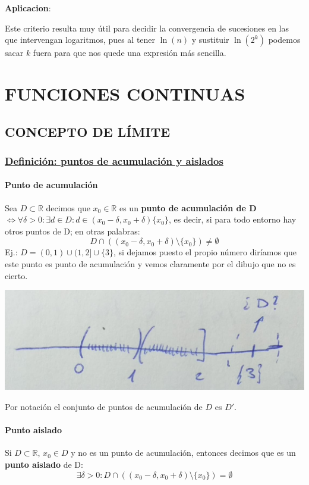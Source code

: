 \documentclass[10pt,a4paper,openright]{book}
\begin{document}
\textbf{Aplicacion}:

Este criterio resulta muy útil para decidir la convergencia de sucesiones en las que intervengan logaritmos, pues al tener $\ln (n)$ y sustituir $\ln (2^k)$ podemos sacar $k$ fuera para que nos quede una expresión más sencilla.


\chapter*{FUNCIONES CONTINUAS}
\section*{CONCEPTO DE LÍMITE}
\subsection*{\underline{Definición: puntos de acumulación y aislados}}
\subsubsection*{Punto de acumulación}
Sea $D\subset \mathbb R$ decimos que $x_0\in \mathbb R$ es un \textbf{punto de acumulación de D} $\Leftrightarrow \forall \delta>0: \exists d\in D: d\in (x_0-\delta, x_0+\delta)\{x_0\}$, es decir, si para todo entorno hay otros puntos de D; en otras palabras:
$$D\cap \left((x_0-\delta, x_0+\delta)\mbox{\textbackslash} \{x_0\}\right)\neq \emptyset$$
Ej.: $D=(0,1)\cup (1,2]\cup \{3\}$, si dejamos puesto el propio número diríamos que este punto es punto de acumulación y vemos claramente por el dibujo que no es cierto.\par

\begin{center}
\includegraphics[scale=0.20]{Cauchy 2}
\end{center}

Por notación el conjunto de puntos de acumulación de $D$ es $D'$.

\subsubsection*{Punto aislado}
Si $D\subset \mathbb R$, $x_0\in D$ y no es un punto de acumulación, entonces decimos que es un \textbf{punto aislado} de D:
$$\exists \delta >0 : D\cap \left((x_0-\delta, x_0+\delta)\mbox{\textbackslash} \{x_0\}\right)= \emptyset$$
\end{document}
